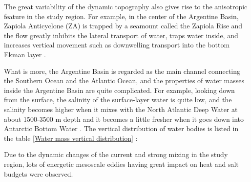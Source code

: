 The great variability of the dynamic topography also gives rise to the anisotropic feature in the study region. For example, in the center of the Argentine Basin, Zapiola Anticyclone (ZA) is trapped by a seamount called the Zapiola Rise and the flow greatly inhibits the lateral transport of water, traps water inside, and increases vertical movement such as downwelling transport into the bottom Ekman layer \cite{weijer2020zapiola,frajka2019atlantic,dewar1998topography}.

What is more, the Argentine Basin is regarded as the main channel connecting the Southern Ocean and the Atlantic Ocean, and the properties of water masses inside the Argentine Basin are quite complicated. For example, looking down from the surface, the salinity of the surface-layer water is quite low, and the salinity becomes higher when it mixes with the North Atlantic Deep Water at about 1500-3500 m depth and it becomes a little fresher when it goes down into Antarctic Bottom Water \cite{talley2011descriptive}. The vertical distribution of water bodies is listed in the table \ref{Water mass vertical distribution} \cite{fontela2021anthropogenic}:

\doublerulesep 0.1pt
\begin{table}[htb]
  \centering
\end{table}

Due to the dynamic changes of the current and strong mixing in the study region, lots of energetic mesoscale eddies having great impact on heat and salt budgets were observed.


